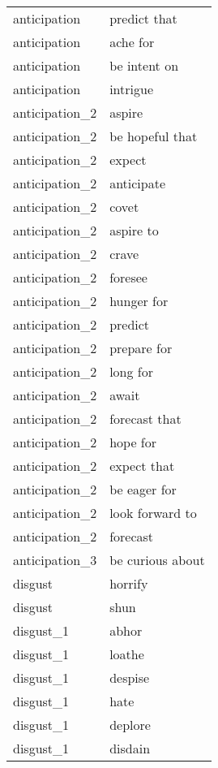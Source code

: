 \begin{longtable}{l|l}
anticipation    & predict that          \\
anticipation    & ache for              \\
anticipation    & be intent on          \\
anticipation    & intrigue              \\
anticipation\_2 & aspire                \\
anticipation\_2 & be hopeful that       \\
anticipation\_2 & expect                \\
anticipation\_2 & anticipate            \\
anticipation\_2 & covet                 \\
anticipation\_2 & aspire to             \\
anticipation\_2 & crave                 \\
anticipation\_2 & foresee               \\
anticipation\_2 & hunger for            \\
anticipation\_2 & predict               \\
anticipation\_2 & prepare for           \\
anticipation\_2 & long for              \\
anticipation\_2 & await                 \\
anticipation\_2 & forecast that         \\
anticipation\_2 & hope for              \\
anticipation\_2 & expect that           \\
anticipation\_2 & be eager for          \\
anticipation\_2 & look forward to       \\
anticipation\_2 & forecast              \\
anticipation\_3 & be curious about      \\
disgust         & horrify               \\
disgust         & shun                  \\
disgust\_1      & abhor                 \\
disgust\_1      & loathe                \\
disgust\_1      & despise               \\
disgust\_1      & hate                  \\
disgust\_1      & deplore               \\
disgust\_1      & disdain               \\

\end{longtable}
